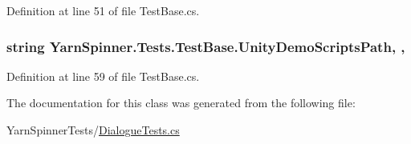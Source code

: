 Definition at line 51 of file Test\-Base.\-cs.

\hypertarget{a00152_a39922286f6255e4fd0e433a4fc7521c4}{
\subsubsection[{Unity\-Demo\-Scripts\-Path}]{\setlength{\rightskip}{0pt plus 5cm}string Yarn\-Spinner.\-Tests.\-Test\-Base.\-Unity\-Demo\-Scripts\-Path\hspace{0.3cm}{\ttfamily [static]}, {\ttfamily [get]}, {\ttfamily [inherited]}}}\label{a00152_a39922286f6255e4fd0e433a4fc7521c4}


Definition at line 59 of file Test\-Base.\-cs.



The documentation for this class was generated from the following file\-:\begin{DoxyCompactItemize}
\item 
Yarn\-Spinner\-Tests/\hyperlink{a00302}{Dialogue\-Tests.\-cs}\end{DoxyCompactItemize}
